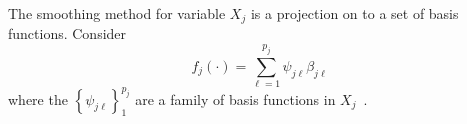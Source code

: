 \documentclass[12pt,letter]{article}
\begin{document}
The smoothing method for variable $X_j$ is a projection on to a set of basis functions. Consider
\begin{equation}
f_j(\cdot) = \sum_{\ell = 1}^{p_j} \psi_{j\ell} \beta_{j\ell} \label{eq:smooth}
\end{equation}
where the $\left\lbrace \psi_{j\ell} \right\rbrace_1^{p_j}$ are a family of basis functions in $X_j$~\citep{hastie2015statistical}. 










\newpage
%


\end{document}
